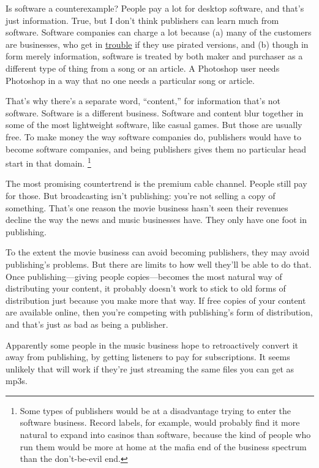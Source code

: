 Is software a counterexample? People pay a lot for desktop software, and
that's just information. True, but I don't think publishers can learn
much from software. Software companies can charge a lot because (a) many
of the customers are businesses, who get in
\href{http://www.bsa.org/country/News\%20and\%20Events/News\%20Archives/en/2009/en-08312009-mueller.aspx?sc_lang=en}{trouble}
if they use pirated versions, and (b) though in form merely information,
software is treated by both maker and purchaser as a different type of
thing from a song or an article. A Photoshop user needs Photoshop in a
way that no one needs a particular song or article.

That's why there's a separate word, ``content,'' for information that's
not software. Software is a different business. Software and content
blur together in some of the most lightweight software, like casual
games. But those are usually free. To make money the way software
companies do, publishers would have to become software companies, and
being publishers gives them no particular head start in that domain.
\footnote{Some types of publishers would be at a disadvantage trying to
enter the software business. Record labels, for example, would probably
find it more natural to expand into casinos than software, because the
kind of people who run them would be more at home at the mafia end of
the business spectrum than the don't-be-evil end.}

The most promising countertrend is the premium cable channel. People
still pay for those. But broadcasting isn't publishing: you're not
selling a copy of something. That's one reason the movie business hasn't
seen their revenues decline the way the news and music businesses have.
They only have one foot in publishing.

To the extent the movie business can avoid becoming publishers, they may
avoid publishing's problems. But there are limits to how well they'll be
able to do that. Once publishing---giving people copies---becomes the
most natural way of distributing your content, it probably doesn't work
to stick to old forms of distribution just because you make more that
way. If free copies of your content are available online, then you're
competing with publishing's form of distribution, and that's just as bad
as being a publisher.

Apparently some people in the music business hope to retroactively
convert it away from publishing, by getting listeners to pay for
subscriptions. It seems unlikely that will work if they're just
streaming the same files you can get as mp3s.

